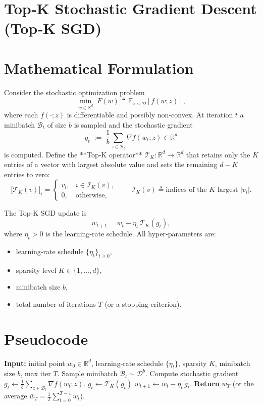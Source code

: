 \documentclass{article}
\newcommand{\E}{\mathbb{E}}
\newcommand{\R}{\mathbb{R}}
\begin{document}
\section*{Top‑K Stochastic Gradient Descent (Top‑K SGD)}

\section*{Mathematical Formulation}
Consider the stochastic optimization problem
\[
\min_{w\in\R^{d}} \; F(w)\triangleq \E_{z\sim\mathcal{D}}[f(w;z)],
\]
where each $f(\cdot;z)$ is differentiable and possibly non‑convex.  
At iteration $t$ a minibatch $\mathcal{B}_t$ of size $b$ is sampled and the stochastic gradient
\[
g_t \;:=\; \frac{1}{b}\sum_{z\in\mathcal{B}_t}\nabla f(w_t;z)\in\R^{d}
\]
is computed.  
Define the **Top‑K operator** $\mathcal{T}_K:\R^{d}\to\R^{d}$ that retains only the $K$ entries of a vector
with largest absolute value and sets the remaining $d-K$ entries to zero:
\[
\big[\mathcal{T}_K(v)\big]_i = 
\begin{cases}
v_i, & i\in\mathcal{I}_K(v),\\[2mm]
0,   & \text{otherwise},
\end{cases}
\qquad 
\mathcal{I}_K(v)\triangleq\text{indices of the $K$ largest }|v_i|.
\]

The Top‑K SGD update is
\begin{equation}
\label{eq:update}
w_{t+1}=w_t-\eta_t\,\mathcal{T}_K(g_t),
\end{equation}
where $\eta_t>0$ is the learning‑rate schedule.  
All hyper‑parameters are:
\begin{itemize}[nosep]
    \item learning‑rate schedule $\{\eta_t\}_{t\ge0}$,
    \item sparsity level $K\in\{1,\dots,d\}$,
    \item minibatch size $b$,
    \item total number of iterations $T$ (or a stopping criterion).
\end{itemize}

\section*{Pseudocode}
\begin{algorithm}[H]
\caption{Top‑K SGD}
\begin{algorithmic}[1]
\State \textbf{Input:} initial point $w_0\in\R^d$, learning‑rate schedule $\{\eta_t\}$, sparsity $K$, minibatch size $b$, max iter $T$.
    \State Sample minibatch $\mathcal{B}_t\sim\mathcal{D}^b$.
    \State Compute stochastic gradient 
    $g_t\gets\frac{1}{b}\sum_{z\in\mathcal{B}_t}\nabla f(w_t;z)$.
    \State $\tilde g_t \gets \mathcal{T}_K(g_t)$ 
    \State $w_{t+1}\gets w_t-\eta_t\,\tilde g_t$.
\EndFor
\State \textbf{Return} $w_T$ (or the average $\bar w_T=\frac{1}{T}\sum_{t=0}^{T-1}w_t$).
\end{algorithmic}
\end{algorithm}
\end{document}
